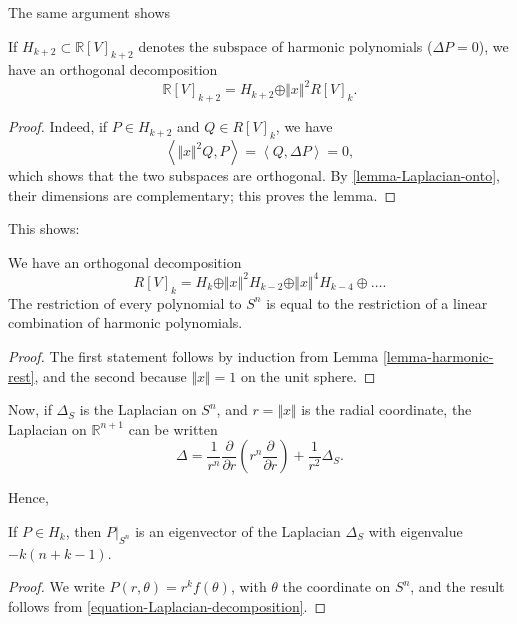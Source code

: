 The same argument shows
\begin{lemma}
 \label{lemma-harmonic-rest}
If $H_{k+2} \subset \mathbb R[V]_{k+2}$ denotes the subspace of harmonic polynomials ($\Delta P=0$), we have an orthogonal decomposition
$$\mathbb R[V]_{k+2} = H_{k+2} \oplus \Vert x\Vert^2 R[V]_k.$$
\end{lemma}

\begin{proof}
 Indeed, if $P \in H_{k+2}$ and $Q\in R[V]_k$, we have 
 $$\left< \Vert x\Vert^2 Q, P\right> =\left < Q, \Delta P \right> =0,$$ 
 which shows that the two subspaces are orthogonal. By \ref{lemma-Laplacian-onto}, their dimensions are complementary; this proves the lemma.
\end{proof}

This shows:
\begin{proposition}
 \label{proposition-harmonic-ontosphere}
 We have an orthogonal decomposition
 $$ R[V]_k = H_k \oplus \Vert x\Vert^2 H_{k-2} \oplus \Vert x\Vert^4 H_{k-4} \oplus \dots.$$
 The restriction of every polynomial to $S^n$ is equal to the restriction of a linear combination of harmonic polynomials.
\end{proposition}

\begin{proof}
 The first statement follows by induction from Lemma \ref{lemma-harmonic-rest}, and the second because $\Vert x\Vert =1$ on the unit sphere.
\end{proof}

Now, if $\Delta_S$ is the Laplacian on $S^n$, and $r = \Vert x\Vert$ is the radial coordinate, the Laplacian on $\mathbb R^{n+1}$ can be written
\begin{equation}
 \label{equation-Laplacian-decomposition}
 \Delta = \frac{1}{r^n} \frac{\partial}{\partial r} \left(r^n \frac{\partial}{\partial r}\right) + \frac{1}{r^2} \Delta_S.
\end{equation}

Hence, 
\begin{lemma}
 \label{lemma-eigenvalue-sphereLaplacian}
If $P\in H_k$, then $P|_{S^n}$ is an eigenvector of the Laplacian $\Delta_S$ with eigenvalue $-k(n+k-1)$.
\end{lemma}

\begin{proof}
 We write $P (r,\theta) = r^k f(\theta)$, with $\theta$ the coordinate on $S^n$, and the result follows from \eqref{equation-Laplacian-decomposition}.
\end{proof}

